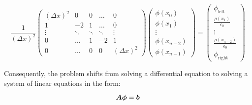 \begin{equation}\label{Eq: Poisson Matrix}
    \frac{1}{(\Delta x)^2}
    \begin{pmatrix}
        (\Delta x)^2 & 0 & 0 & \dots & 0 \\
        1 & -2 & 1 & \dots & 0 \\
        \vdots & \ddots & \ddots & \ddots & \vdots \\
        0 & \dots & 1 & -2 & 1 \\
        0 & \dots & 0 & 0 & (\Delta x)^2
    \end{pmatrix}
    \begin{pmatrix}
        \phi(x_0) \\
        \phi(x_1) \\
        \vdots \\
        \phi(x_{n-2}) \\
        \phi(x_{n-1})
    \end{pmatrix}
    =
    \begin{pmatrix}
        \phi_\mathrm{left} \\
        \frac{\rho(x_1)}{\epsilon_0} \\
        \vdots \\
        \frac{\rho(x_{n-2})}{\epsilon_0} \\
        \phi_\mathrm{right}
    \end{pmatrix}
\end{equation}
\vspace{0.3cm}

Consequently, the problem shifts from solving a differential equation to solving a system of linear equations in the form:

\begin{equation}\label{Eq: general linear system}
    \bm{A} \bm{\phi} = \bm{b}
\end{equation}

